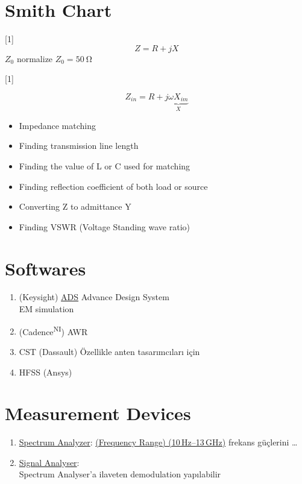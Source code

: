 \documentclass[11pt,a4paper]{article}
\begin{document}

\section{Smith Chart}
[1]
\[ Z = R + jX \]
$Z_0$ normalize \quad $Z_0 = \qty{50}{\ohm}$

[1]

\[ Z_{in} = R + j\underbrace{\omega X_{im}}_{X} \]

\begin{itemize}
\item Impedance matching
\item Finding transmission line length
\item Finding the value of L or C used for matching
\item Finding reflection coefficient of both load or source
\item Converting Z to admittance Y
\item Finding VSWR (Voltage Standing wave ratio)
\end{itemize}

\section{Softwares}
\begin{enumerate}[label=\arabic*-]
\item (Keysight) \underline{ADS} Advance Design System \\ \hspace*{1.2em} EM simulation
\item (Cadence\textsuperscript{NI}) AWR \quad {}
\item CST (Dassault) \quad Özellikle anten tasarımcıları için
\item HFSS (Ansys)
\end{enumerate}

\section{Measurement Devices}
\begin{enumerate}[label=\arabic*)]
\item \underline{Spectrum Analyzer}: \underline{(Frequency Range) (10\,Hz--13\,GHz)} \quad frekans güçlerini \dots
\item \underline{Signal Analyser}: \\ Spectrum Analyser'a ilaveten demodulation yapılabilir
\end{enumerate}
\end{document}
